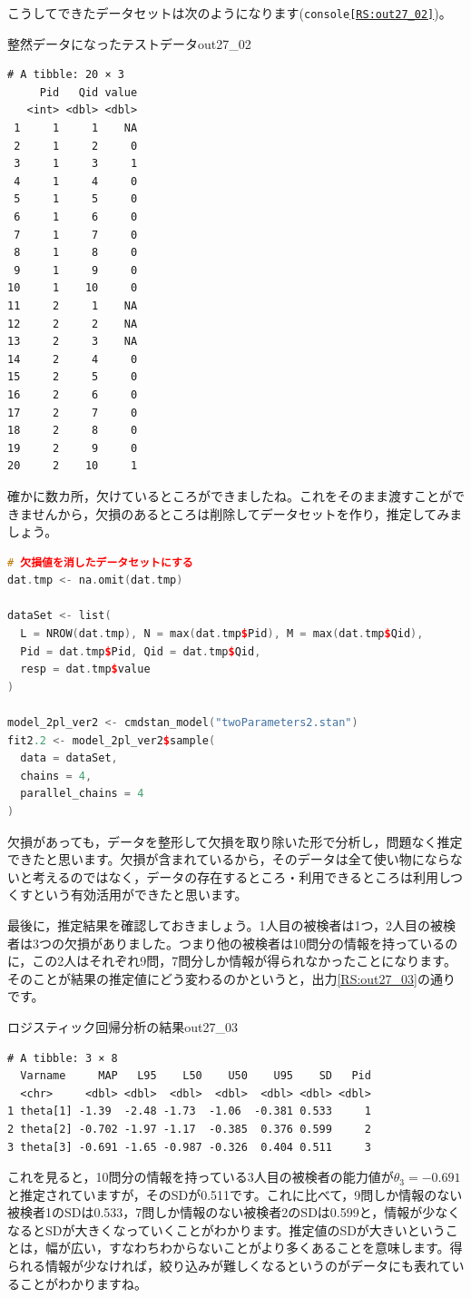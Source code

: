 \documentclass{ltjsbook}
\begin{document}
こうしてできたデータセットは次のようになります(\texttt{console\ref{RS:out27_02}})。
\begin{Rscreen}{整然データになったテストデータ}{out27_02}
    \begin{verbatim}
# A tibble: 20 × 3
     Pid   Qid value
   <int> <dbl> <dbl>
 1     1     1    NA
 2     1     2     0
 3     1     3     1
 4     1     4     0
 5     1     5     0
 6     1     6     0
 7     1     7     0
 8     1     8     0
 9     1     9     0
10     1    10     0
11     2     1    NA
12     2     2    NA
13     2     3    NA
14     2     4     0
15     2     5     0
16     2     6     0
17     2     7     0
18     2     8     0
19     2     9     0
20     2    10     1
    \end{verbatim}
\end{Rscreen}
確かに数カ所，欠けているところができましたね。これをそのまま渡すことができませんから，欠損のあるところは削除してデータセットを作り，推定してみましょう。
\begin{lstlisting}[language=c++,label={code::27_03},caption={データセットを作って推定する}]
# 欠損値を消したデータセットにする
dat.tmp <- na.omit(dat.tmp)

dataSet <- list(
  L = NROW(dat.tmp), N = max(dat.tmp$Pid), M = max(dat.tmp$Qid),
  Pid = dat.tmp$Pid, Qid = dat.tmp$Qid,
  resp = dat.tmp$value
)

model_2pl_ver2 <- cmdstan_model("twoParameters2.stan")
fit2.2 <- model_2pl_ver2$sample(
  data = dataSet,
  chains = 4,
  parallel_chains = 4
)
\end{lstlisting}
欠損があっても，データを整形して欠損を取り除いた形で分析し，問題なく推定できたと思います。欠損が含まれているから，そのデータは全て使い物にならないと考えるのではなく，データの存在するところ・利用できるところは利用しつくすという有効活用ができたと思います。

最後に，推定結果を確認しておきましょう。1人目の被検者は1つ，2人目の被検者は3つの欠損がありました。つまり他の被検者は10問分の情報を持っているのに，この2人はそれぞれ9問，7問分しか情報が得られなかったことになります。
そのことが結果の推定値にどう変わるのかというと，出力\ref{RS:out27_03}の通りです。
\begin{SCrstan}{ロジスティック回帰分析の結果}{out27_03}
    \begin{verbatim}
# A tibble: 3 × 8
  Varname     MAP   L95    L50    U50    U95    SD   Pid
  <chr>     <dbl> <dbl>  <dbl>  <dbl>  <dbl> <dbl> <dbl>
1 theta[1] -1.39  -2.48 -1.73  -1.06  -0.381 0.533     1
2 theta[2] -0.702 -1.97 -1.17  -0.385  0.376 0.599     2
3 theta[3] -0.691 -1.65 -0.987 -0.326  0.404 0.511     3
    \end{verbatim}
\end{SCrstan}
これを見ると，10問分の情報を持っている3人目の被検者の能力値が$\theta_3 = -0.691$と推定されていますが，そのSDが0.511です。これに比べて，9問しか情報のない被検者1のSDは0.533，7問しか情報のない被検者2のSDは0.599と，情報が少なくなるとSDが大きくなっていくことがわかります。推定値のSDが大きいということは，幅が広い，すなわちわからないことがより多くあることを意味します。得られる情報が少なければ，絞り込みが難しくなるというのがデータにも表れていることがわかりますね。
\end{document}
